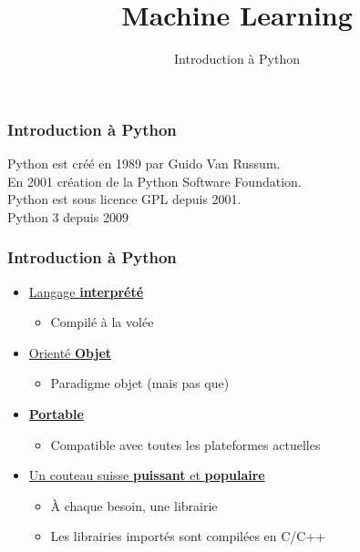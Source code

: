 \documentclass{formation}
\title{Machine Learning}
\subtitle{Introduction à Python}
\begin{document}
\maketitle

\begin{frame}
  \frametitle{Introduction à Python}
  Python est créé en 1989 par Guido Van Russum. \\
  En 2001 création de la Python Software Foundation. \\
  Python est sous licence GPL depuis 2001. \\
  Python 3 depuis 2009
\end{frame}

\begin{frame}
  \frametitle{Introduction à Python}
  \begin{itemize}
  \item \underline{Langage \textbf{interprété}}
    \begin{itemize}
    \item Compilé à la volée
    \end{itemize}
  \item \underline{Orienté \textbf{Objet}}
    \begin{itemize}
    \item Paradigme objet (mais pas que)
    \end{itemize}
  \item \underline{\textbf{Portable}}
    \begin{itemize}
    \item Compatible  avec toutes les plateformes actuelles
    \end{itemize}
  \item \underline{Un couteau suisse \textbf{puissant} et \textbf{populaire}}
    \begin{itemize}
    \item À chaque besoin, une librairie
    \item Les librairies importés sont compilées en C/C++
    \end{itemize}
  \end{itemize}
\end{frame}
\end{document}
